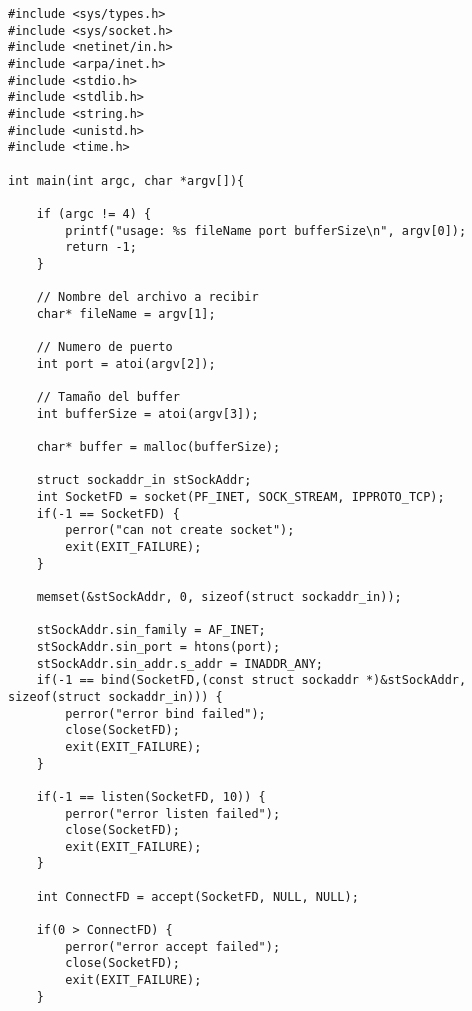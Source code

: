 \documentclass[12pt, letterpaper]{article}
\begin{document}
\clearpage
\begin{appendices}
\begin{verbatim}
#include <sys/types.h>
#include <sys/socket.h>
#include <netinet/in.h>
#include <arpa/inet.h>
#include <stdio.h>
#include <stdlib.h>
#include <string.h>
#include <unistd.h>
#include <time.h>

int main(int argc, char *argv[]){

	if (argc != 4) {
		printf("usage: %s fileName port bufferSize\n", argv[0]);
		return -1;
	}
	
	// Nombre del archivo a recibir
	char* fileName = argv[1];
	
	// Numero de puerto
	int port = atoi(argv[2]);
	
	// Tamaño del buffer
	int bufferSize = atoi(argv[3]);
	
	char* buffer = malloc(bufferSize);
	
	struct sockaddr_in stSockAddr;
	int SocketFD = socket(PF_INET, SOCK_STREAM, IPPROTO_TCP);
	if(-1 == SocketFD) {
		perror("can not create socket");
		exit(EXIT_FAILURE);
	}
	
	memset(&stSockAddr, 0, sizeof(struct sockaddr_in));
	
	stSockAddr.sin_family = AF_INET;
	stSockAddr.sin_port = htons(port);
	stSockAddr.sin_addr.s_addr = INADDR_ANY;
	if(-1 == bind(SocketFD,(const struct sockaddr *)&stSockAddr, sizeof(struct sockaddr_in))) {
		perror("error bind failed");
		close(SocketFD);
		exit(EXIT_FAILURE);
	}
	
	if(-1 == listen(SocketFD, 10)) {
		perror("error listen failed");
		close(SocketFD);
		exit(EXIT_FAILURE);
	}
	
	int ConnectFD = accept(SocketFD, NULL, NULL);
	
	if(0 > ConnectFD) {
		perror("error accept failed");
		close(SocketFD);
		exit(EXIT_FAILURE);
	}
	

\end{verbatim}
\end{appendices}
\end{document}
